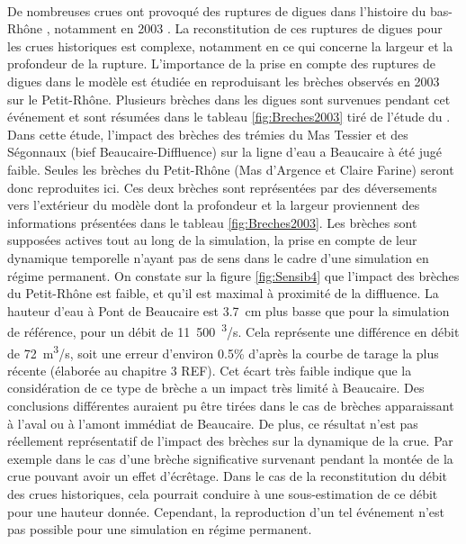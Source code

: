 \documentclass[11pt]{article}
\begin{document}
	\paragraph{} De nombreuses crues ont provoqué des ruptures de digues dans l'histoire du bas-Rhône \citep{pichard_sept_2014}, notamment en 2003 \citep{medd_debit_2005}. La reconstitution de ces ruptures de digues pour les crues historiques est complexe, notamment en ce qui concerne la largeur et la profondeur de la rupture. L'importance de la prise en compte des ruptures de digues dans le modèle est étudiée en reproduisant les brèches observés en 2003 sur le Petit-Rhône. Plusieurs brèches dans les digues sont survenues pendant cet événement et sont résumées dans le tableau \ref{fig:Breches2003} tiré de l'étude du \citet{symadrem_programme_2012}. Dans cette étude, l'impact des brèches des trémies du Mas Tessier et des Ségonnaux (bief Beaucaire-Diffluence) sur la ligne d'eau a Beaucaire à été jugé faible. Seules les brèches du Petit-Rhône (Mas d'Argence et Claire Farine) seront donc reproduites ici. Ces deux brèches sont représentées par des déversements vers l'extérieur du modèle dont la profondeur et la largeur proviennent des informations présentées dans le tableau \ref{fig:Breches2003}. Les brèches sont supposées actives tout au long de la simulation, la prise en compte de leur dynamique temporelle n'ayant pas de sens dans le cadre d'une simulation en régime permanent. On constate sur la figure \ref{fig:Sensib4} que l'impact des brèches du Petit-Rhône est faible, et qu'il est maximal à proximité de la diffluence. La hauteur d'eau à Pont de Beaucaire est 3.7~cm plus basse que pour la simulation de référence, pour un débit de 11~500~\textsuperscript{3}/s. Cela représente une différence en débit de 72~m\textsuperscript{3}/s, soit une erreur d'environ 0.5\% d'après la courbe de tarage la plus récente (élaborée au chapitre 3 REF). Cet écart très faible indique que la considération de ce type de brèche a un impact très limité à Beaucaire. Des conclusions différentes auraient pu être tirées dans le cas de brèches apparaissant à l'aval ou à l'amont immédiat de Beaucaire. De plus, ce résultat n'est pas réellement représentatif de l'impact des brèches sur la dynamique de la crue. Par exemple dans le cas d'une brèche significative survenant pendant la montée de la crue pouvant avoir un effet d'écrêtage. Dans le cas de la reconstitution du débit des crues historiques, cela pourrait conduire à une sous-estimation de ce débit pour une hauteur donnée. Cependant, la reproduction d'un tel événement n'est pas possible pour une simulation en régime permanent.
	
\end{document}
